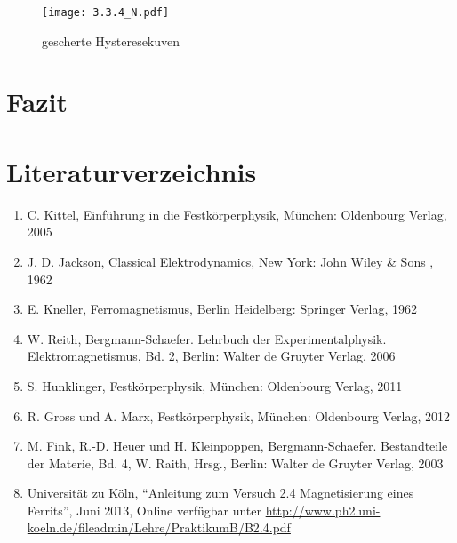 \documentclass[12pt,a4paper]{scrartcl}
\numberwithin{equation}{section} %
\renewcommand{\[}{} %
\renewcommand{\]}{\noindent} %
\newcommand{\tightlist}{} %
\begin{document}
\begin{figure}
\centering
\texttt{[image: 3.3.4\_N.pdf]}
\caption{gescherte Hysteresekuven}
\end{figure}

\hypertarget{fazit}{%
\section{Fazit}\label{fazit}}

\hypertarget{literaturverzeichnis}{%
\section{Literaturverzeichnis}\label{literaturverzeichnis}}

\begin{enumerate}
\def\labelenumi{\arabic{enumi}.}
\tightlist
\item
  C. Kittel, Einführung in die Festkörperphysik, München: Oldenbourg
  Verlag, 2005
\item
  J. D. Jackson, Classical Elektrodynamics, New York: John Wiley \& Sons
  , 1962
\item
  E. Kneller, Ferromagnetismus, Berlin Heidelberg: Springer Verlag, 1962
\item
  W. Reith, Bergmann-Schaefer. Lehrbuch der Experimentalphysik.
  Elektromagnetismus, Bd. 2, Berlin: Walter de Gruyter Verlag, 2006
\item
  S. Hunklinger, Festkörperphysik, München: Oldenbourg Verlag, 2011
\item
  R. Gross und A. Marx, Festkörperphysik, München: Oldenbourg Verlag,
  2012
\item
  M. Fink, R.-D. Heuer und H. Kleinpoppen, Bergmann-Schaefer.
  Bestandteile der Materie, Bd. 4, W. Raith, Hrsg., Berlin: Walter de
  Gruyter Verlag, 2003
\item
  Universität zu Köln, ``Anleitung zum Versuch 2.4 Magnetisierung eines
  Ferrits'', Juni 2013, Online verfügbar unter
  \url{http://www.ph2.uni-koeln.de/fileadmin/Lehre/PraktikumB/B2.4.pdf}
\end{enumerate}
\end{document}

